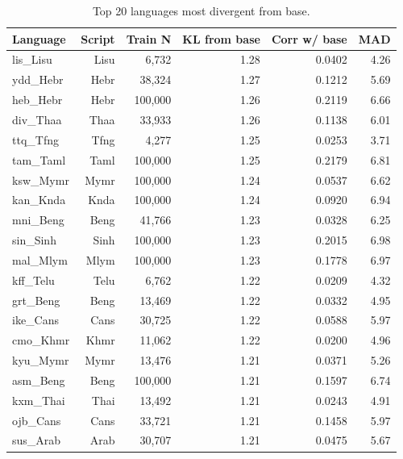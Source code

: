 \begin{table}[htbp]
\centering
\small
\begin{tabular}{lrrrrr}
\toprule
\textbf{Language} & \textbf{Script} & \textbf{Train N} & \textbf{KL from base} & \textbf{Corr w/ base} & \textbf{MAD} \\
\midrule
lis_Lisu & Lisu & 6,732 & 1.28 & 0.0402 & 4.26 \\
ydd_Hebr & Hebr & 38,324 & 1.27 & 0.1212 & 5.69 \\
heb_Hebr & Hebr & 100,000 & 1.26 & 0.2119 & 6.66 \\
div_Thaa & Thaa & 33,933 & 1.26 & 0.1138 & 6.01 \\
ttq_Tfng & Tfng & 4,277 & 1.25 & 0.0253 & 3.71 \\
tam_Taml & Taml & 100,000 & 1.25 & 0.2179 & 6.81 \\
ksw_Mymr & Mymr & 100,000 & 1.24 & 0.0537 & 6.62 \\
kan_Knda & Knda & 100,000 & 1.24 & 0.0920 & 6.94 \\
mni_Beng & Beng & 41,766 & 1.23 & 0.0328 & 6.25 \\
sin_Sinh & Sinh & 100,000 & 1.23 & 0.2015 & 6.98 \\
mal_Mlym & Mlym & 100,000 & 1.23 & 0.1778 & 6.97 \\
kff_Telu & Telu & 6,762 & 1.22 & 0.0209 & 4.32 \\
grt_Beng & Beng & 13,469 & 1.22 & 0.0332 & 4.95 \\
ike_Cans & Cans & 30,725 & 1.22 & 0.0588 & 5.97 \\
cmo_Khmr & Khmr & 11,062 & 1.22 & 0.0200 & 4.96 \\
kyu_Mymr & Mymr & 13,476 & 1.21 & 0.0371 & 5.26 \\
asm_Beng & Beng & 100,000 & 1.21 & 0.1597 & 6.74 \\
kxm_Thai & Thai & 13,492 & 1.21 & 0.0243 & 4.91 \\
ojb_Cans & Cans & 33,721 & 1.21 & 0.1458 & 5.97 \\
sus_Arab & Arab & 30,707 & 1.21 & 0.0475 & 5.67 \\
\bottomrule
\end{tabular}
\caption{Top 20 languages most divergent from base.}
\label{tab:kl-top}
\end{table}


